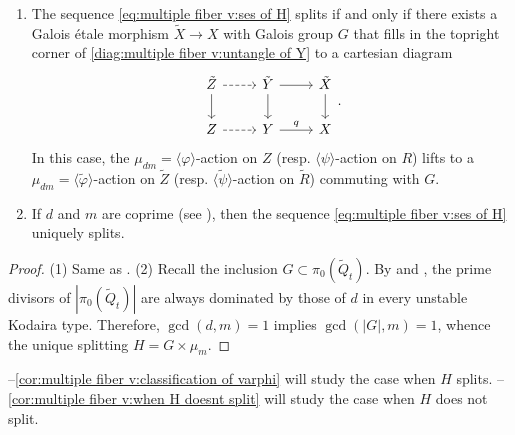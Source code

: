 \documentclass[reqno, letterpaper]{amsart}
\numberwithin{equation}{subsection}
\let\to\longrightarrow
\begin{document}
		\begin{lemma} \label{lem:multiple fiber v:untangle of X}
			\begin{enumerate}
				\item The sequence \eqref{eq:multiple fiber v:ses of H} splits if and only if there exists a Galois \'etale morphism $\tilde X \to X$ with Galois group $G$ that fills in the topright corner of \eqref{diag:multiple fiber v:untangle of Y} to a cartesian diagram
				\[\begin{tikzcd}
					\tilde Z \arrow[r, dashed] \arrow[d] & \tilde Y \arrow[r] \arrow[d] & \tilde X \arrow[d] \\
					Z \arrow[r, dashed] & Y \arrow[r, "q"] & X
				\end{tikzcd}.\]
				In this case, the $\mu_{dm} = \langle \varphi \rangle$-action on $Z$ (resp. $\langle \psi \rangle$-action on $R$) lifts to a $\mu_{dm} = \langle \tilde \varphi \rangle$-action on $\tilde Z$ (resp. $\langle \tilde \psi \rangle$-action on $\tilde R$) commuting with $G$.
				
				\item If $d$ and $m$ are coprime (see ), then the sequence \eqref{eq:multiple fiber v:ses of H} uniquely splits.
			\end{enumerate}
		\end{lemma}
		\begin{proof}
			(1) Same as . (2) Recall the inclusion $G \subset \pi_0(\tilde Q_t)$. By  and , the prime divisors of $|\pi_0(\tilde Q_t)|$ are always dominated by those of $d$ in every unstable Kodaira type. Therefore, $\gcd(d, m) = 1$ implies $\gcd (|G|, m) = 1$, whence the unique splitting $H = G \times \mu_m$.
		\end{proof}
		
		--\ref{cor:multiple fiber v:classification of varphi} will study the case when $H$ splits. --\ref{cor:multiple fiber v:when H doesnt split} will study the case when $H$ does not split.
		
\end{document}
